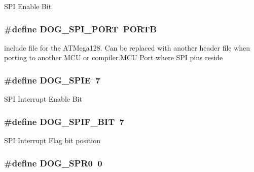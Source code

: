 S\-P\-I Enable Bit \hypertarget{group___d_o_g_m128__user__configuration_gaf9e7124c755de651dd19889cd4304e37}{
\subsubsection[{D\-O\-G\-\_\-\-S\-P\-I\-\_\-\-P\-O\-R\-T}]{\setlength{\rightskip}{0pt plus 5cm}\#define D\-O\-G\-\_\-\-S\-P\-I\-\_\-\-P\-O\-R\-T~P\-O\-R\-T\-B}}\label{group___d_o_g_m128__user__configuration_gaf9e7124c755de651dd19889cd4304e37}
include file for the A\-T\-Mega128. Can be replaced with another header file when porting to another M\-C\-U or compiler.\-M\-C\-U Port where S\-P\-I pins reside \hypertarget{group___d_o_g_m128__user__configuration_ga24deca3ddbd39da12413f13d47c31ab3}{
\subsubsection[{D\-O\-G\-\_\-\-S\-P\-I\-E}]{\setlength{\rightskip}{0pt plus 5cm}\#define D\-O\-G\-\_\-\-S\-P\-I\-E~7}}\label{group___d_o_g_m128__user__configuration_ga24deca3ddbd39da12413f13d47c31ab3}
S\-P\-I Interrupt Enable Bit \hypertarget{group___d_o_g_m128__user__configuration_ga7ee84e00e7608b2c0db5be4c98d2f372}{
\subsubsection[{D\-O\-G\-\_\-\-S\-P\-I\-F\-\_\-\-B\-I\-T}]{\setlength{\rightskip}{0pt plus 5cm}\#define D\-O\-G\-\_\-\-S\-P\-I\-F\-\_\-\-B\-I\-T~7}}\label{group___d_o_g_m128__user__configuration_ga7ee84e00e7608b2c0db5be4c98d2f372}
S\-P\-I Interrupt Flag bit position \hypertarget{group___d_o_g_m128__user__configuration_ga5b3f5b6050798cb4e898420cca291231}{
\subsubsection[{D\-O\-G\-\_\-\-S\-P\-R0}]{\setlength{\rightskip}{0pt plus 5cm}\#define D\-O\-G\-\_\-\-S\-P\-R0~0}}\label{group___d_o_g_m128__user__configuration_ga5b3f5b6050798cb4e898420cca291231}
